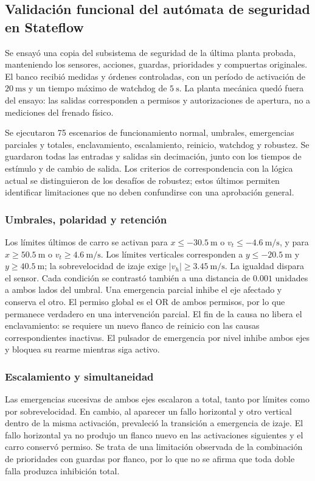 \subsection{Validación funcional del autómata de seguridad en Stateflow}
\label{sec:validacion_seguridad_stateflow}
Se ensayó una copia del subsistema de seguridad de la última planta probada, manteniendo los sensores, acciones, guardas, prioridades y compuertas originales. El banco recibió medidas y órdenes controladas, con un período de activación de $20~\mathrm{ms}$ y un tiempo máximo de watchdog de $5~\mathrm{s}$. La planta mecánica quedó fuera del ensayo: las salidas corresponden a permisos y autorizaciones de apertura, no a mediciones del frenado físico.

Se ejecutaron 75 escenarios de funcionamiento normal, umbrales, emergencias parciales y totales, enclavamiento, escalamiento, reinicio, watchdog y robustez. Se guardaron todas las entradas y salidas sin decimación, junto con los tiempos de estímulo y de cambio de salida. Los criterios de correspondencia con la lógica actual se distinguieron de los desafíos de robustez; estos últimos permiten identificar limitaciones que no deben confundirse con una aprobación general.

\subsubsection{Umbrales, polaridad y retención}
Los límites últimos de carro se activan para $x\leq-30.5~\mathrm{m}$ o $v_t\leq-4.6~\mathrm{m/s}$, y para $x\geq50.5~\mathrm{m}$ o $v_t\geq4.6~\mathrm{m/s}$. Los límites verticales corresponden a $y\leq-20.5~\mathrm{m}$ y $y\geq40.5~\mathrm{m}$; la sobrevelocidad de izaje exige $|v_h|\geq3.45~\mathrm{m/s}$. La igualdad dispara el sensor. Cada condición se contrastó también a una distancia de $0.001$ unidades a ambos lados del umbral.
Una emergencia parcial inhibe el eje afectado y conserva el otro. El permiso global es el OR de ambos permisos, por lo que permanece verdadero en una intervención parcial. El fin de la causa no libera el enclavamiento: se requiere un nuevo flanco de reinicio con las causas correspondientes inactivas. El pulsador de emergencia por nivel inhibe ambos ejes y bloquea su rearme mientras siga activo.

\subsubsection{Escalamiento y simultaneidad}
Las emergencias sucesivas de ambos ejes escalaron a total, tanto por límites como por sobrevelocidad. En cambio, al aparecer un fallo horizontal y otro vertical dentro de la misma activación, prevaleció la transición a emergencia de izaje. El fallo horizontal ya no produjo un flanco nuevo en las activaciones siguientes y el carro conservó permiso. Se trata de una limitación observada de la combinación de prioridades con guardas por flanco, por lo que no se afirma que toda doble falla produzca inhibición total.

